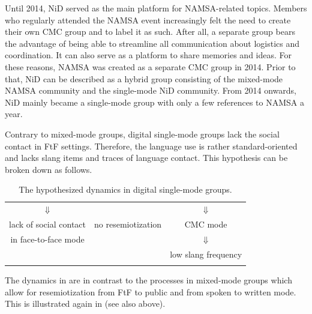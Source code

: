 \documentclass[output=paper]{langsci/langscibook}
\begin{document}
Until 2014, NiD served as the main platform for NAMSA-related topics. Members who regularly attended the NAMSA event increasingly felt the need to create their own CMC group and to label it as such. After all, a separate group bears the advantage of being able to streamline all communication about logistics and coordination. It can also serve as a platform to share memories and ideas. For these reasons, NAMSA was created as a separate CMC group in 2014.  Prior to that, NiD can be described as a hybrid group consisting of the mixed-mode NAMSA community and the single-mode NiD community. From 2014 onwards, NiD mainly became a single-mode group with only a few references to NAMSA a year.

Contrary to mixed-mode groups, digital single-mode groups lack the social contact in FtF settings. Therefore, the language use is rather standard-oriented and lacks slang items and traces of language contact. This hypothesis can be broken down as follows.

 
\begin{table} 
\begin{tabularx}{0.8\textwidth}{ccc}
\lsptoprule
\multicolumn{3}{c}{digital single-mode groups}\\
\midrule
${\Downarrow}$ & & ${\Downarrow}$\\
lack of social contact & no resemiotization & CMC mode\\
in face-to-face mode & & ${\Downarrow}$\\
& & low slang frequency\\
\lspbottomrule
\end{tabularx}
\caption{The hypothesized dynamics in digital single-mode groups.}
\label{tab:radke:3}
\end{table}  


The dynamics in  are in contrast to the processes in mixed-mode groups which allow for resemiotization from FtF to public and from spoken to written mode. This is illustrated again in  (see also  above).
\end{document}
